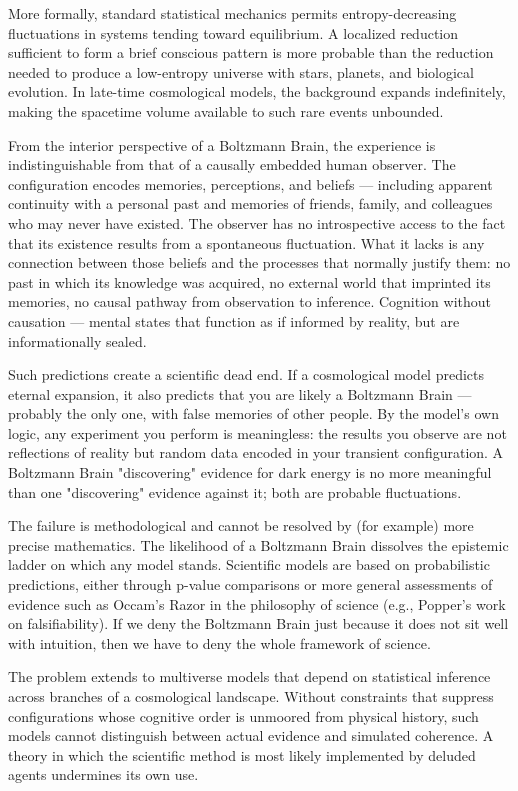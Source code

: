 More formally, standard statistical mechanics permits entropy-decreasing fluctuations in systems tending toward equilibrium. A localized reduction sufficient to form a brief conscious pattern is more probable than the reduction needed to produce a low-entropy universe with stars, planets, and biological evolution. In late-time cosmological models, the background expands indefinitely, making the spacetime volume available to such rare events unbounded.

From the interior perspective of a Boltzmann Brain, the experience is indistinguishable from that of a causally embedded human observer. The configuration encodes memories, perceptions, and beliefs — including apparent continuity with a personal past and memories of friends, family, and colleagues who may never have existed. The observer has no introspective access to the fact that its existence results from a spontaneous fluctuation. What it lacks is any connection between those beliefs and the processes that normally justify them: no past in which its knowledge was acquired, no external world that imprinted its memories, no causal pathway from observation to inference. Cognition without causation — mental states that function as if informed by reality, but are informationally sealed.

Such predictions create a scientific dead end. If a cosmological model predicts eternal expansion, it also predicts that you are likely a Boltzmann Brain — probably the only one, with false memories of other people. By the model's own logic, any experiment you perform is meaningless: the results you observe are not reflections of reality but random data encoded in your transient configuration. A Boltzmann Brain "discovering" evidence for dark energy is no more meaningful than one "discovering" evidence against it; both are probable fluctuations.

The failure is methodological and cannot be resolved by (for example) more precise mathematics. The likelihood of a Boltzmann Brain dissolves the epistemic ladder on which any model stands. Scientific models are based on probabilistic predictions, either through p-value comparisons or more general assessments of evidence such as Occam's Razor in the philosophy of science (e.g., Popper's work on falsifiability). If we deny the Boltzmann Brain just because it does not sit well with intuition, then we have to deny the whole framework of science.

The problem extends to multiverse models that depend on statistical inference across branches of a cosmological landscape. Without constraints that suppress configurations whose cognitive order is unmoored from physical history, such models cannot distinguish between actual evidence and simulated coherence. A theory in which the scientific method is most likely implemented by deluded agents undermines its own use.

